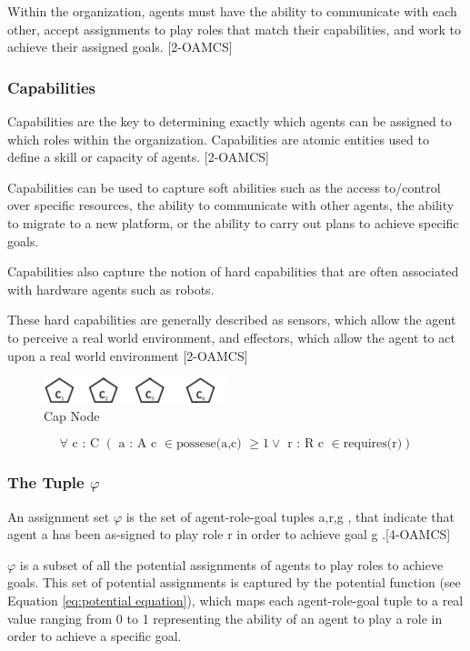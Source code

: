 Within the organization, agents must have the ability to communicate with each other, accept
assignments to play roles that match their capabilities, and work to achieve their assigned goals. [2-OAMCS]


\subsubsection{ Capabilities } 

Capabilities are the key to determining exactly which agents can be assigned to which roles
within the organization. Capabilities are atomic entities used to define a skill or capacity of
agents. [2-OAMCS]

Capabilities can be used to capture soft abilities such as the access to/control over specific
resources, the ability to communicate with other agents, the ability to migrate to a new platform,
or the ability to carry out plans to achieve specific goals. 

Capabilities also capture the notion of hard capabilities that are often associated 
with hardware agents such as robots. 

These hard capabilities are generally described as sensors, which allow the agent to perceive a real world
environment, and effectors, which allow the agent to act upon a real world environment  [2-OAMCS]

\begin{figure}[th]
	\centering
		\includegraphics{chapiter1/img/Cap}
	\caption{\label{fig:Cap Node}Cap Node }
\end{figure}


\begin{equation}
\forall\textrm{ c : C }\left(\textrm{ a : A c }\in\textrm{possese(a,c) }\geq1\lor\textrm{ r : R c }\in\textrm{requires(r)}\right)\label{eq : capabilities}
\end{equation}


\subsubsection{ The Tuple  $\varphi$ } 
An assignment set $\varphi$ is the set of agent-role-goal tuples  \textlangle{} a,r,g \textrangle{} , that indicate that agent a has been as-signed to play role r in order to achieve goal g .[4-OAMCS]

$\varphi$ is a subset of all the potential assignments of agents to play roles to achieve goals. This set of potential assignments is captured by the potential function (see Equation \ref{eq:potential equation}), which maps each agent-role-goal tuple to a real value ranging from 0 to 1 representing the ability of an agent to play a role in order to achieve a specific goal.
	  
